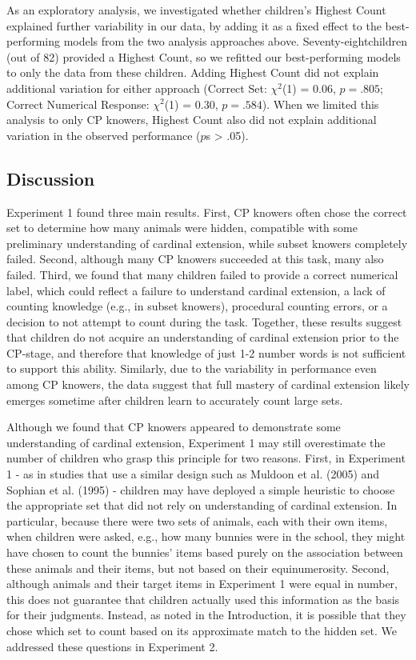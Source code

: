 \documentclass[
  man,floatsintext]{apa7}
\begin{document}
As an exploratory analysis, we investigated whether children's Highest Count explained further variability in our data, by adding it as a fixed effect to the best-performing models from the two analysis approaches above. Seventy-eightchildren (out of 82) provided a Highest Count, so we refitted our best-performing models to only the data from these children. Adding Highest Count did not explain additional variation for either approach (Correct Set: \(\chi^2\)(1) = 0.06, \(p = .805\); Correct Numerical Response: \(\chi^2\)(1) = 0.30, \(p = .584\)). When we limited this analysis to only CP knowers, Highest Count also did not explain additional variation in the observed performance (\(p\)s \textgreater{} .05).

\hypertarget{discussion}{%
\subsection{Discussion}\label{discussion}}

Experiment 1 found three main results. First, CP knowers often chose the correct set to determine how many animals were hidden, compatible with some preliminary understanding of cardinal extension, while subset knowers completely failed. Second, although many CP knowers succeeded at this task, many also failed. Third, we found that many children failed to provide a correct numerical label, which could reflect a failure to understand cardinal extension, a lack of counting knowledge (e.g., in subset knowers), procedural counting errors, or a decision to not attempt to count during the task. Together, these results suggest that children do not acquire an understanding of cardinal extension prior to the CP-stage, and therefore that knowledge of just 1-2 number words is not sufficient to support this ability. Similarly, due to the variability in performance even among CP knowers, the data suggest that full mastery of cardinal extension likely emerges sometime after children learn to accurately count large sets.

Although we found that CP knowers appeared to demonstrate some understanding of cardinal extension, Experiment 1 may still overestimate the number of children who grasp this principle for two reasons. First, in Experiment 1 - as in studies that use a similar design such as Muldoon et al. (2005) and Sophian et al. (1995) - children may have deployed a simple heuristic to choose the appropriate set that did not rely on understanding of cardinal extension. In particular, because there were two sets of animals, each with their own items, when children were asked, e.g., how many bunnies were in the school, they might have chosen to count the bunnies' items based purely on the association between these animals and their items, but not based on their equinumerosity. Second, although animals and their target items in Experiment 1 were equal in number, this does not guarantee that children actually used this information as the basis for their judgments. Instead, as noted in the Introduction, it is possible that they chose which set to count based on its approximate match to the hidden set. We addressed these questions in Experiment 2.
\end{document}
